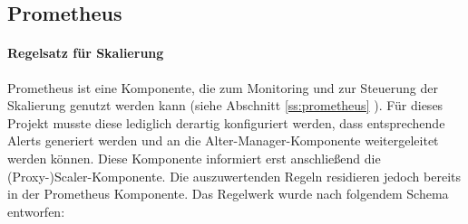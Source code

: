 \subsection{Prometheus}

\paragraph{Regelsatz für Skalierung}
Prometheus ist eine Komponente, die zum Monitoring und zur Steuerung der Skalierung genutzt werden kann (siehe Abschnitt \ref{ss:prometheus} ). Für dieses Projekt musste diese lediglich derartig konfiguriert werden, dass entsprechende Alerts generiert werden und an die Alter-Manager-Komponente weitergeleitet werden können. Diese Komponente informiert erst anschließend die (Proxy-)Scaler-Komponente. Die auszuwertenden Regeln residieren jedoch bereits in der Prometheus Komponente. Das Regelwerk wurde nach folgendem Schema entworfen:

\bigskip

